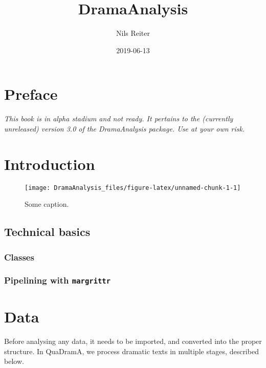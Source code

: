 \documentclass[]{book}
\title{DramaAnalysis}
\author{Nils Reiter}
\date{2019-06-13}
\begin{document}
\maketitle

{
\setcounter{tocdepth}{1}
\tableofcontents
}
\hypertarget{preface}{%
\chapter*{Preface}\label{preface}}

\emph{This book is in alpha stadium and not ready. It pertains to the (currently unreleased) version 3.0 of the DramaAnalysis package. Use at your own risk.}

\hypertarget{introduction}{%
\chapter{Introduction}\label{introduction}}

\begin{figure}
\texttt{[image: DramaAnalysis\_files/figure-latex/unnamed-chunk-1-1]} \caption{Some caption.}\label{fig:unnamed-chunk-1}
\end{figure}

\hypertarget{technical-basics}{%
\section{Technical basics}\label{technical-basics}}

\hypertarget{classes}{%
\subsection{Classes}\label{classes}}

\hypertarget{pipelining-with-margrittr}{%
\subsection{\texorpdfstring{Pipelining with \texttt{margrittr}}{Pipelining with margrittr}}\label{pipelining-with-margrittr}}

\hypertarget{data}{%
\chapter{Data}\label{data}}

Before analysing any data, it needs to be imported, and converted into the proper structure. In QuaDramA, we process dramatic texts in multiple stages, described below.
\end{document}
